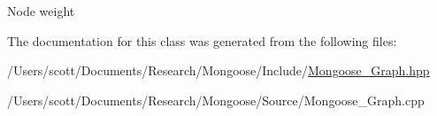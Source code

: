 Node weight 

The documentation for this class was generated from the following files\+:\begin{DoxyCompactItemize}
\item 
/\+Users/scott/\+Documents/\+Research/\+Mongoose/\+Include/\hyperlink{_mongoose___graph_8hpp}{Mongoose\+\_\+\+Graph.\+hpp}\item 
/\+Users/scott/\+Documents/\+Research/\+Mongoose/\+Source/Mongoose\+\_\+\+Graph.\+cpp\end{DoxyCompactItemize}
